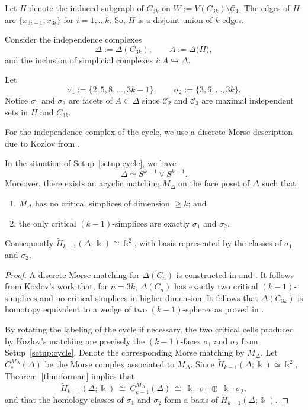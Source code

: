 \documentclass[12pt]{amsart}
\theoremstyle{plain}
\theoremstyle{definition}
\begin{document}
\begin{notation}
\label{setup:cycle}
Let $H$ denote the induced subgraph of $C_{3k}$ on $W := V(C_{3k})\setminus \mathcal{C}_1$. The edges of $H$ are $\{x_{3i-1},x_{3i}\}$ for $i=1,\ldots k$. So, $H$ is a disjoint union of $k$ edges.


Consider the independence complexes
\[
  \Delta := \Delta(C_{3k}), \qquad A := \Delta\big(H\big),
\]
and the inclusion of simplicial complexes $i\colon A\hookrightarrow \Delta$.

Let
\[
  \sigma_1 :=  \{2,5,8,\dots,3k-1\},\qquad
  \sigma_2 :=  \{3,6,\dots,3k\}.
\]
Notice  $\sigma_1$ and $\sigma_2$ are facets of $A\subset \Delta$
 since   $\mathcal{C}_2$ and $\mathcal{C}_3$ are maximal independent sets in $H$ and $C_{3k}$.  
 \end{notation}


For the independence complex of the cycle, we use a discrete Morse description due to Kozlov from \cite{KozlovBook,KozlovInd}.

\begin{lem}
\label{lem:Delta-critcells}
In the situation of Setup~\ref{setup:cycle}, we have
\[\Delta  \simeq S^{k-1} \vee S^{k-1}.\]
Moreover, there exists an acyclic matching $M_\Delta$ on the face poset of $\Delta$ such that:
\begin{enumerate}
  \item $M_\Delta$ has no critical simplices of dimension $\ge k$; and
  \item the only critical $(k-1)$-simplices are exactly $\sigma_1$ and $\sigma_2$.
\end{enumerate}
Consequently $\widetilde H_{k-1}(\Delta;\Bbbk)\cong \Bbbk^2$, with basis represented by the classes of $\sigma_1$ and $\sigma_2$.
\end{lem}

\begin{proof}
A discrete Morse matching for $\Delta(C_n)$ is constructed in \cite[Proposition 5.2]{KozlovInd} and \cite[Proposition 11.17]{KozlovBook}. It follows from Kozlov's work that, for $n=3k$, $\Delta(C_n)$  has exactly two critical $(k-1)$-simplices and no critical simplices in higher dimension. It follows that $\Delta(C_{3k})$ is homotopy equivalent to a wedge of two $(k-1)$-spheres as proved in \cite{KozlovBook, KozlovInd}.

By rotating the labeling of the cycle if necessary, the two critical cells produced by Kozlov's matching are precisely the $(k-1)$-faces $\sigma_1$ and $\sigma_2$ from Setup~\ref{setup:cycle}. Denote the corresponding Morse matching by $M_\Delta$. Let $C^{M_\Delta}_\ast(\Delta)$ be the Morse complex associated to $M_\Delta$.  Since  $\widetilde H_{k-1}(\Delta;\Bbbk) \simeq \Bbbk^2$,  Theorem~\ref{thm:forman}  implies that
\[
  \widetilde H_{k-1}(\Delta;\Bbbk)\ \cong\ C^{M_\Delta}_{k-1}(\Delta)
  \ \cong\ \Bbbk\cdot\sigma_1 \ \oplus\ \Bbbk\cdot\sigma_2,
\]
and that the homology classes of $\sigma_1$ and $\sigma_2$ form a basis of $\widetilde H_{k-1}(\Delta;\Bbbk)$.
\end{proof}
\end{document}
